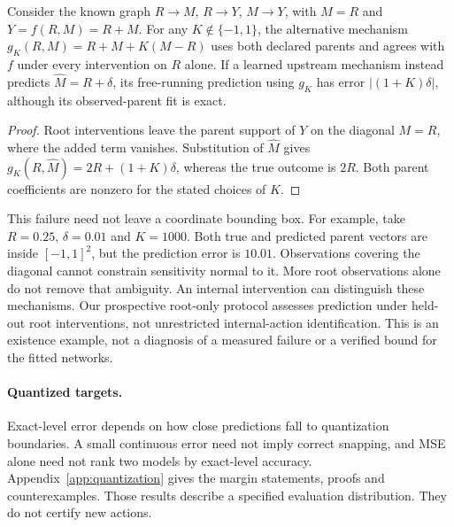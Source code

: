 \begin{proposition}
Consider the known graph $R\to M$, $R\to Y$, $M\to Y$, with
$M=R$ and $Y=f(R,M)=R+M$. For any $K\notin\{-1,1\}$, the alternative
mechanism $g_K(R,M)=R+M+K(M-R)$ uses both declared parents and agrees with
$f$ under every intervention on $R$ alone. If a learned upstream mechanism
instead predicts $\hat M=R+\delta$, its free-running prediction using $g_K$
has error $|(1+K)\delta|$, although its observed-parent fit is exact.
\end{proposition}
\begin{proof}
Root interventions leave the parent support of $Y$ on the diagonal $M=R$,
where the added term vanishes. Substitution of $\hat M$ gives
$g_K(R,\hat M)=2R+(1+K)\delta$, whereas the true outcome is $2R$.
Both parent coefficients are nonzero for the stated choices of $K$.
\end{proof}
This failure need not leave a coordinate bounding box. For example, take
$R=0.25$, $\delta=0.01$ and $K=1000$. Both true and predicted parent vectors
are inside $[-1,1]^2$, but the prediction error is $10.01$. Observations
covering the diagonal cannot constrain sensitivity normal to it. More root
observations alone do not remove that ambiguity. An internal intervention can
distinguish these mechanisms. Our prospective root-only protocol assesses
prediction under held-out root interventions, not unrestricted internal-action
identification. This is an existence example, not a diagnosis of a measured
failure or a verified bound for the fitted networks.

\paragraph{Quantized targets.}
Exact-level error depends on how close predictions fall to quantization
boundaries. A small continuous error need not imply correct snapping, and MSE
alone need not rank two models by exact-level accuracy. Appendix~\ref{app:quantization}
gives the margin statements, proofs and counterexamples. Those results describe
a specified evaluation distribution. They do not certify new actions.
